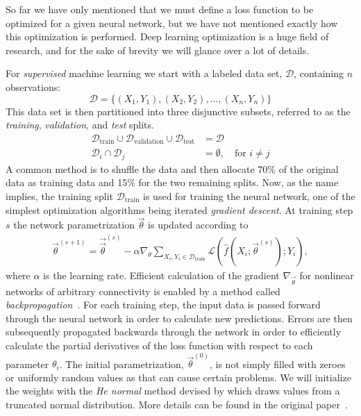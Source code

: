 So far we have only mentioned that we must define a loss function to be optimized for a given neural network, but we have not mentioned exactly how this optimization is performed.
Deep learning optimization is a huge field of research, and for the sake of brevity we will glance over a lot of details.

For \textit{supervised} machine learning we start with a labeled data set, $\mathcal{D}$, containing $n$ observations:
%
\begin{equation*}
  \mathcal{D} = \{(X_1, Y_1), (X_2, Y_2), \ldots, (X_n, Y_n)\}
\end{equation*}
%
This data set is then partitioned into three disjunctive subsets, referred to as the \textit{training}, \textit{validation}, and \textit{test} splits.
%
\begin{align*}
  \mathcal{D}_{\mathrm{train}} \cup \mathcal{D}_{\mathrm{validation}} \cup \mathcal{D}_{\mathrm{test}} &= \mathcal{D}\\
  \mathcal{D}_i \cap \mathcal{D}_j &= \emptyset,~~~\text{ for } i \neq j
\end{align*}
%
A common method is to shuffle the data and then allocate 70\% of the original data as training data and 15\% for the two remaining splits.
Now, as the name implies, the training split $\mathcal{D}_{\mathrm{train}}$ is used for training the neural network, one of the simplest optimization algorithms being iterated \textit{gradient descent}.
At training step $s$ the network parametrization $\vec{\theta}$ is updated according to
%
\begin{align*}
  \vec{\theta}^{(s + 1)}
  =
    \vec{\vec{\theta}}^{(s)}
    -
    \alpha \nabla_{\theta}
      \sum_{X_i, Y_i \in \mathcal{D}_{\mathrm{train}}}
      \mathcal{L}\left(\hat{f}\left(X_i; \vec{\theta}^{(s)}\right); Y_i\right)
  ,
\end{align*}
%
where $\alpha$ is the learning rate.
Efficient calculation of the gradient $\nabla_{\vec{\theta}}$ for nonlinear networks of arbitrary connectivity is enabled by a method called \textit{backpropagation}~\cite{backpropagation}.
For each training step, the input data is passed forward through the neural network in order to calculate new predictions.
Errors are then subsequently propagated backwards through the network in order to efficiently calculate the partial derivatives of the loss function with respect to each parameter $\theta_i$.
The initial parametrization, $\vec{\theta}^{(0)}$, is not simply filled with zeroes or uniformly random values as that can cause certain problems.
We will initialize the weights with the \textit{He normal} method devised by \citeauthor{he-normal} which draws values from a truncated normal distribution.
More details can be found in the original paper~\cite{he-normal}.

